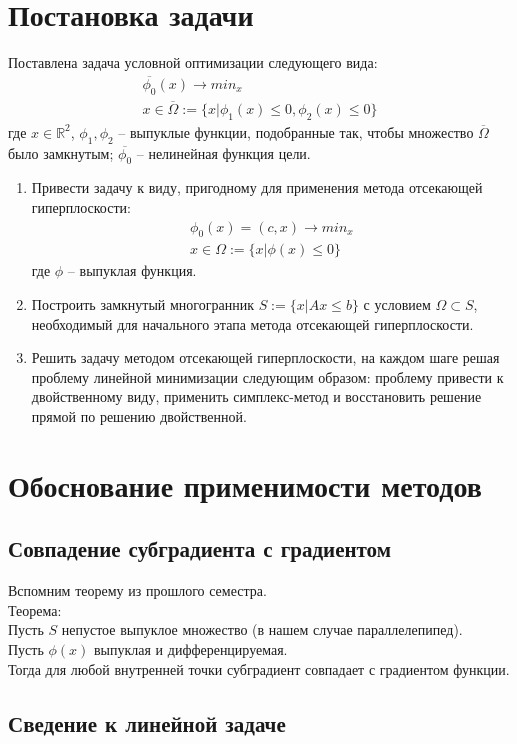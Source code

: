 \documentclass[main.tex]{subfiles}
\begin{document}
	
\section{Постановка задачи}
Поставлена задача условной оптимизации следующего вида:
\begin{gather*}
\overline{\phi_0}(x) \rightarrow min_{x} \\
x \in \overline{\varOmega} := \{x|\phi_1(x) \le 0, \phi_2(x) \le 0\} 
\end{gather*}
где $x \in \mathds{R}^2$, $\phi_1, \phi_2$ -- выпуклые функции, подобранные так, чтобы множество $\overline{\varOmega}$ было замкнутым; $\overline{\phi_0}$ -- нелинейная функция цели.\\
\begin{enumerate}
	\item Привести задачу к виду, пригодному для применения метода отсекающей гиперплоскости:
	\begin{gather*}
	\phi_0(x) = (c, x) \rightarrow min_{x} \\
	x \in \varOmega := \{x|\phi(x) \le 0\} 
	\end{gather*}
	где $\phi$ -- выпуклая функция.
	\item Построить замкнутый многогранник $S:=\{x|Ax\le b\}$ с условием $\varOmega \subset S$, необходимый для начального этапа метода отсекающей гиперплоскости.
	\item Решить задачу методом отсекающей гиперплоскости, на каждом шаге решая проблему линейной минимизации следующим образом: проблему привести к двойственному виду, применить симплекс-метод и восстановить решение прямой по решению двойственной.
\end{enumerate}
\section{Обоснование применимости методов}
\subsection{Совпадение субградиента с градиентом}
Вспомним теорему из прошлого семестра.\\
Теорема:\\
Пусть $S$ непустое выпуклое множество (в нашем случае параллелепипед).\\
Пусть $\phi(x)$ выпуклая и дифференцируемая.\\
Тогда для любой внутренней точки субградиент совпадает с градиентом функции.
\subsection{Сведение к линейной задаче}

\end{document}
